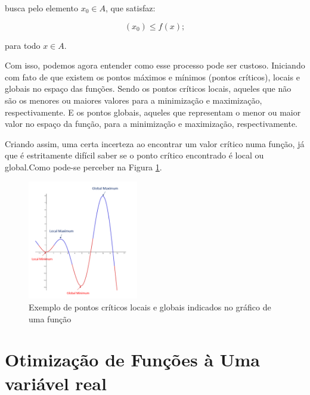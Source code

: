                 busca pelo elemento \(x_0 \in A\), que satisfaz:

                    \begin{equation}
                        (x_0) \leq f(x);
                    \end{equation}

                para todo \(x \in A\).

\vspace{\baselineskip}
Com isso, podemos agora entender como esse processo pode ser custoso. Iniciando
com fato de que existem os pontos máximos e mínimos (pontos críticos), locais
e globais no espaço das funções. Sendo os pontos críticos locais, aqueles que
não são os menores ou maiores valores para a minimização e maximização,
respectivamente. E os pontos globais, aqueles que representam o menor ou maior
valor no espaço da função, para a minimização e maximização, respectivamente.

Criando assim, uma certa incerteza ao encontrar um valor crítico numa função,
já que é estritamente difícil saber se o ponto crítico encontrado é local ou
global.Como pode-se perceber na Figura
\ref{grafico_local_global_pontosCriticos}.


\begin{figure}[h]
    \includegraphics[width=0.43\textwidth]
        {src/grafico_local_global_pontosCriticos.png}
    \centering
    \caption{Exemplo de pontos críticos locais e globais indicados no gráfico
        de uma função}
    \label{grafico_local_global_pontosCriticos}
\end{figure}


\section{{Otimização de Funções à Uma variável real}}

\hspace{0.8cm}

